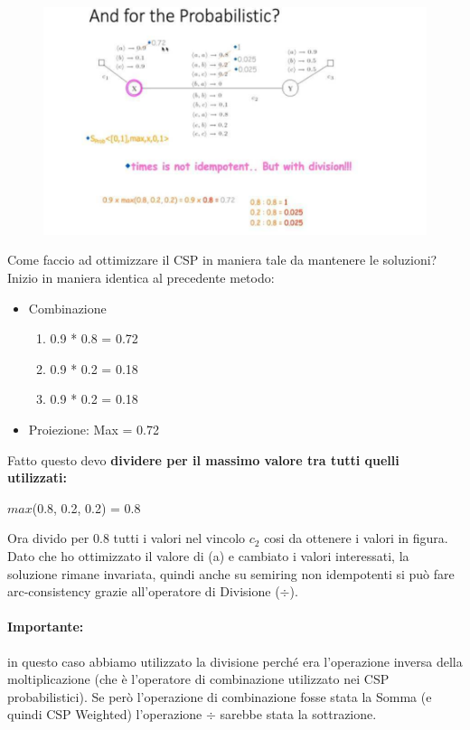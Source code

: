 \begin{figure}[htp]
    \centering
    \includegraphics[width=14cm, keepaspectratio]{img/Cap5/Probabilistic2.png}
\end{figure}

Come faccio ad ottimizzare il CSP in maniera tale da mantenere le soluzioni?
\\Inizio in maniera identica al precedente metodo:
\begin{itemize}
    \item Combinazione
          \begin{enumerate}
              \item 0.9 * 0.8 = 0.72
              \item 0.9 * 0.2 = 0.18
              \item 0.9 * 0.2 = 0.18
          \end{enumerate}
    \item Proiezione: Max = 0.72
\end{itemize}
\noindent Fatto questo devo \textbf{dividere per il massimo valore tra tutti
    quelli utilizzati:}
\begin{center}
    $max$(0.8, 0.2, 0.2) = 0.8
\end{center}
Ora divido per 0.8 tutti i valori nel vincolo $c_2$ cosi da ottenere i valori in
figura. Dato che ho ottimizzato il valore di (a) e cambiato i valori
interessati, la soluzione rimane invariata, quindi anche su semiring non
idempotenti si può fare arc-consistency grazie all'operatore di Divisione
($\div$).

\paragraph{Importante:} in questo caso abbiamo utilizzato la
divisione perché era l'operazione inversa della moltiplicazione (che è
l'operatore di combinazione utilizzato nei CSP probabilistici). Se però
l'operazione di combinazione fosse stata la Somma (e quindi CSP Weighted)
l'operazione $\div$ sarebbe stata la sottrazione.


